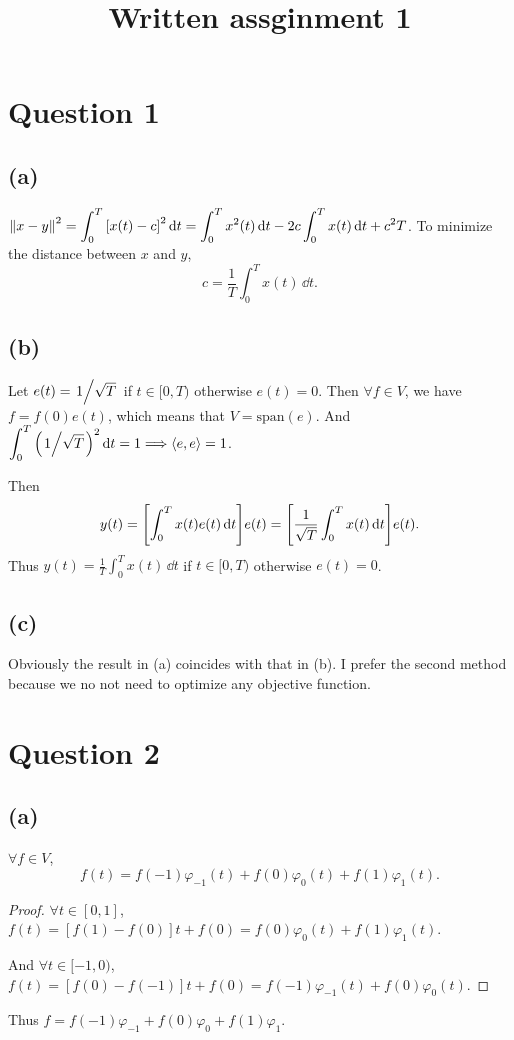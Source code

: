 \documentclass{article}
\begin{document}
\title{Written assginment 1}
\maketitle
\section*{Question 1}
\subsection*{(a)}

$\displaystyle \norm{x-y}^2=\int_{0}^{T} \qty[x(t)-c]^2 \,\dd t=\int_{0}^{T} x^2(t) \,\dd t - 2c \int_{0}^{T} x(t) \,\dd t + c^2T$.
To minimize the distance between $x$ and $y$,
\[
	c=\frac{1}{T}\int_{0}^{T} x(t) \,\dd t
	.\]

\subsection*{(b)}
Let $e(t)=\flatfrac{1}{\sqrt{T}}$ if  $t\in[0,T)$ otherwise  $e(t)=0$. Then  $\forall f \in V$, we have $f=f(0)e(t)$, which means that  $V=\text{span}(e)$. And $\displaystyle \int_{0}^{T} \qty(\flatfrac{1}{\sqrt{T}})^2 \,\dd t=1\Longrightarrow\angbr{e,e}=1$.

Then
\[
	y(t)=\qty[{\int_{0}^{T} x(t)e(t) \,\dd t}]e(t) = \qty[\frac{1}{\sqrt{T}}\int_{0}^{T} x(t) \,\dd t] e(t)
	.\]
Thus $\displaystyle y(t)=\frac{1}{T}\int_{0}^{T} x(t) \,\dd t$ if  $t\in[0,T)$ otherwise  $e(t)=0$.

\subsection*{(c)}
Obviously the result in (a) coincides with that in (b). I prefer the second method because we no not need to optimize any objective function.


\section*{Question 2}
\subsection*{(a)}
\begin{prp}
	$\forall f \in V$, \[f(t)=f(-1)\varphi_{-1}(t)+f(0)\varphi_0(t)+f(1)\varphi_1(t).\]
\end{prp}
\begin{proof}
	$\forall t\in[0,1]$, $f(t)=[f(1)-f(0)]t+f(0)=f(0)\varphi_0(t)+f(1)\varphi_1(t)$.

	And $\forall t\in[-1,0)$, $f(t)=[f(0)-f(-1)]t+f(0)=f(-1)\varphi_{-1}(t)+f(0)\varphi_0(t)$.
\end{proof}
Thus $f=f(-1)\varphi_{-1}+f(0)\varphi_0+f(1)\varphi_1$.
\end{document}
